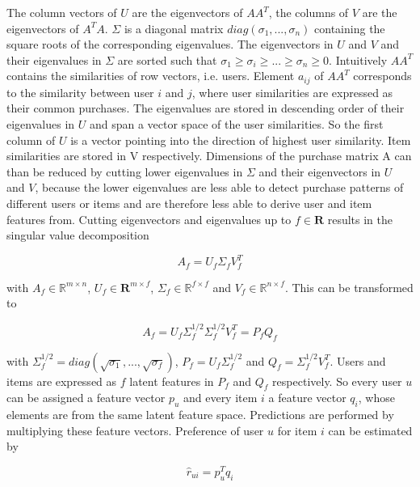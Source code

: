 \documentclass[10pt]{reportMaster}
\begin{document}
The column vectors of $U$ are the eigenvectors of $AA^T$, the columns of $V$ are the eigenvectors of $A^TA$.
$\Sigma$ is a diagonal matrix $diag(\sigma_1, ..., \sigma_n)$ containing the square roots of the corresponding eigenvalues.  %
The eigenvectors in $U$ and $V$ and their eigenvalues in $\Sigma$ are sorted such that $\sigma_1 \geq \sigma_i \geq ... \geq \sigma_n \geq 0$.
Intuitively $AA^T$ contains the similarities of row vectors, i.e. users.
Element $a_{ij}$ of $AA^T$ corresponds to the similarity between user $i$ and $j$, where user similarities are expressed as their common purchases.
The eigenvalues are stored in descending order of their eigenvalues in $U$ and span a vector space of the user similarities.
So the first column of $U$ is a vector pointing into the direction of highest user similarity. %
Item similarities are stored in V respectively.
Dimensions of the purchase matrix A can than be reduced by cutting lower eigenvalues in $\Sigma$ and their eigenvectors in $U$ and $V$, because the lower eigenvalues are less able to detect purchase patterns of different users or items and are therefore less able to derive user and item features from.
Cutting eigenvectors and eigenvalues up to $f \in \mathbf{R}$ results in the singular value decomposition 

\begin{equation}
	A_f = U_f \Sigma_f V_f^T
\end{equation}

with $A_f \in \mathds{R}^{m \times n}$, $U_f \in \mathbf{R}^{m \times f}$, $\Sigma_f \in \mathds{R}^{f \times f}$ and $V_f \in \mathds{R}^{n \times f}$.
This can be transformed to 

\begin{equation}
	A_f = U_f \Sigma_f^{1/2} \Sigma_f^{1/2} V_f^T = P_f Q_f
\end{equation}

with $\Sigma_f^{1/2} = diag(\sqrt{\sigma_1}, ..., \sqrt{\sigma_f})$, $P_f = U_f \Sigma_f^{1/2}$ and $Q_f = \Sigma_f^{1/2} V_f^T$.
Users and items are expressed as $f$ latent features in $P_f$ and $Q_f$ respectively.
So every user $u$ can be assigned a feature vector $p_u$ and every item $i$ a feature vector $q_i$, whose elements are from the same latent feature space.
Predictions are performed by multiplying these feature vectors.
Preference of user $u$ for item $i$ can be estimated by 

\begin{equation}
	\hat{r}_{ui} = p_u^T q_i
\end{equation}
\end{document}
